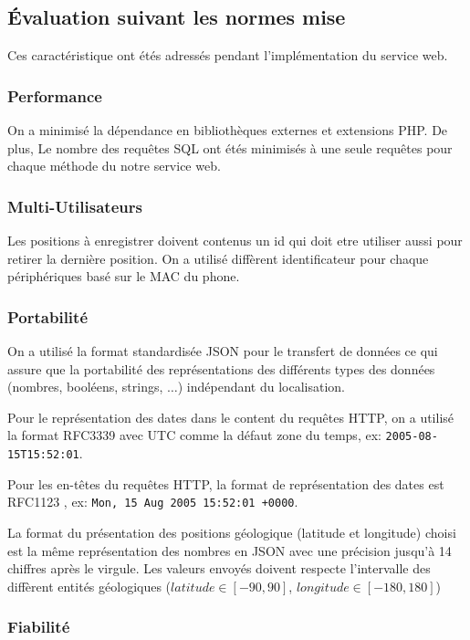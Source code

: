 \subsection{Évaluation suivant les normes mise}
Ces caractéristique ont étés adressés pendant l'implémentation du service web.

\subsubsection{Performance}

On a minimisé la dépendance en bibliothèques externes et extensions PHP.
De plus, Le nombre des requêtes SQL ont étés minimisés à une seule requêtes pour
chaque méthode du notre service web.

\subsubsection{Multi-Utilisateurs}

Les positions à enregistrer doivent contenus un id qui doit etre utiliser aussi
pour retirer la dernière position.
On a utilisé diffèrent identificateur pour chaque périphériques basé sur le MAC
du phone.

\subsubsection{Portabilité}

On a utilisé la format standardisée JSON pour le transfert de données ce qui
assure que la portabilité des représentations des différents types des données
(nombres, booléens, strings, $\dotsc$) indépendant du localisation.

Pour le représentation des dates dans le content du requêtes HTTP, on a utilisé
la format RFC3339 \cite{RFC3339} avec UTC comme la défaut zone du temps, ex:
\verb|2005-08-15T15:52:01|.

Pour les en-têtes du requêtes HTTP, la format de représentation des dates est
RFC1123 \cite{RFC1123}, ex: \verb|Mon, 15 Aug 2005 15:52:01 +0000|.

La format du présentation des positions géologique (latitude et longitude)
choisi est la même représentation des nombres en JSON avec une précision jusqu'à
14 chiffres après le virgule. Les valeurs envoyés doivent respecte l'intervalle
des diffèrent entités géologiques ($latitude \in [-90, 90]$,
$longitude \in [-180, 180]$)

\subsubsection{Fiabilité}

